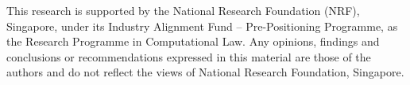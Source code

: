\documentclass[sigconf]{acmart}
\begin{document}




%



\begin{acks}
This research is supported by the National Research Foundation (NRF),
Singapore, under its Industry Alignment Fund -- Pre-Positioning Programme, as
the Research Programme in Computational Law. Any opinions, findings and
conclusions or recommendations expressed in this material are those of the
authors and do not reflect the views of National Research Foundation,
Singapore.
\end{acks}
  
%



\newpage
\appendix



\end{document}
